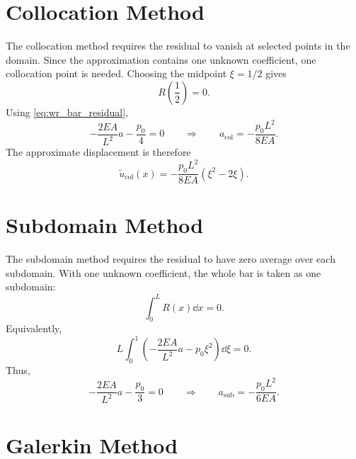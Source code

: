\section{Collocation Method}

The collocation method requires the residual to vanish at selected points in
the domain. Since the approximation contains one unknown coefficient, one
collocation point is needed. Choosing the midpoint $\xi=1/2$ gives
\begin{equation}
    R\left(\frac{1}{2}\right)=0 .
\end{equation}
Using \cref{eq:wr_bar_residual},
\begin{equation}
    -\frac{2EA}{L^2}a - \frac{p_0}{4} = 0
    \qquad\Rightarrow\qquad
    a_{\mathrm{col}} = -\frac{p_0L^2}{8EA}.
    \label{eq:wr_collocation_a}
\end{equation}
The approximate displacement is therefore
\begin{equation}
    \tilde{u}_{\mathrm{col}}(x)
    = -\frac{p_0L^2}{8EA}\left(\xi^2-2\xi\right).
\end{equation}

\section{Subdomain Method}

The subdomain method requires the residual to have zero average over each
subdomain. With one unknown coefficient, the whole bar is taken as one
subdomain:
\begin{equation}
    \int_0^L R(x)\dd x = 0 .
\end{equation}
Equivalently,
\begin{equation}
    L\int_0^1 \left(
    -\frac{2EA}{L^2}a - p_0\xi^2
    \right)\dd \xi = 0 .
\end{equation}
Thus,
\begin{equation}
    -\frac{2EA}{L^2}a - \frac{p_0}{3} = 0
    \qquad\Rightarrow\qquad
    a_{\mathrm{sub}} = -\frac{p_0L^2}{6EA}.
    \label{eq:wr_subdomain_a}
\end{equation}

\section{Galerkin Method}

